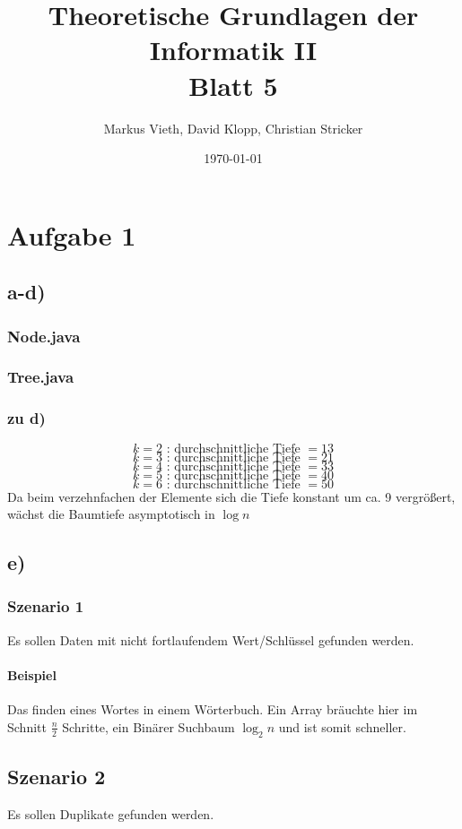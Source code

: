 \documentclass[a4paper,11pt,twoside]{article}
\title{Theoretische Grundlagen der Informatik II\\ Blatt 5}
\author{Markus Vieth, David Klopp, Christian Stricker}
\date{\today}
\begin{document}
\maketitle
\cleardoublepage
\pagestyle{myheadings}
\section*{Aufgabe 1}
\subsection*{a-d)}
\subsubsection*{Node.java}

\subsubsection*{Tree.java}

\subsubsection*{zu d)}
\[k = 2 \text{ : durchschnittliche Tiefe }= 13\]
\[k = 3 \text{ : durchschnittliche Tiefe }= 21\]
\[k = 4 \text{ : durchschnittliche Tiefe }= 33\]
\[k = 5 \text{ : durchschnittliche Tiefe }= 40\]
\[k = 6 \text{ : durchschnittliche Tiefe }= 50\]
Da beim verzehnfachen der Elemente sich die Tiefe konstant um ca. 9 vergrößert, wächst die Baumtiefe asymptotisch in $\log n$ 
\subsection*{e)}
\subsubsection*{Szenario 1}
Es sollen Daten mit nicht fortlaufendem Wert/Schlüssel gefunden werden.\\
\paragraph*{Beispiel} Das finden eines Wortes in einem Wörterbuch. Ein Array bräuchte hier im Schnitt $\frac{n}{2}$ Schritte, ein Binärer Suchbaum $\log_2 n$ und ist somit schneller.
\subsection*{Szenario 2}
Es sollen Duplikate gefunden werden.\\
\end{document}
